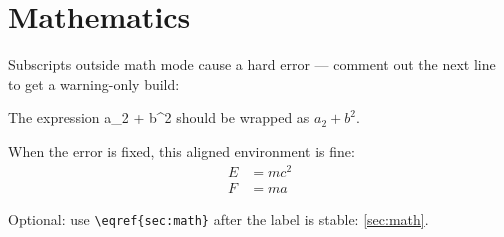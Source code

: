 \section{Mathematics}\label{sec:math}

Subscripts outside math mode cause a hard error --- comment out the next line to get a
warning-only build:

The expression a_2 + b^2 should be wrapped as $a_2 + b^2$.

When the error is fixed, this aligned environment is fine:
\begin{align}
  E &= mc^2 \\
  F &= ma
\end{align}

Optional: use \verb|\eqref{sec:math}| after the label is stable: \eqref{sec:math}.
